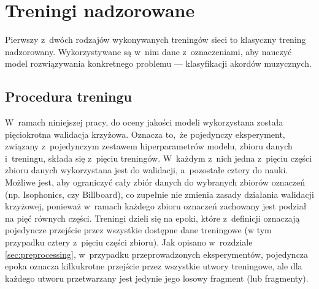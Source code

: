 \section{Treningi nadzorowane}

Pierwszy z~dwóch rodzajów wykonywanych treningów sieci to klasyczny trening nadzorowany.  Wykorzystywane są w~nim dane z~oznaczeniami, aby nauczyć model rozwiązywania konkretnego problemu --- klasyfikacji akordów muzycznych. 


\subsection{Procedura treningu}

W~ramach niniejszej pracy, do oceny jakości modeli wykorzystana została pięciokrotna walidacja krzyżowa. Oznacza to, że pojedynczy eksperyment, związany z~pojedynczym zestawem hiperparametrów modelu, zbioru danych i~treningu, składa się z~pięciu treningów. W~każdym z~nich jedna z~pięciu części zbioru danych wykorzystana jest do walidacji, a~pozostałe cztery do nauki. Możliwe jest, aby ograniczyć cały zbiór danych do wybranych zbiorów oznaczeń (np. Isophonics, czy Billboard), co zupełnie nie zmienia zasady działania walidacji krzyżowej, ponieważ w~ramach każdego zbioru oznaczeń zachowany jest podział na pięć równych części. Treningi dzieli się na epoki, które z~definicji oznaczają pojedyncze przejście przez wszystkie dostępne dane treningowe (w tym przypadku cztery z~pięciu części zbioru). Jak opisano w~rozdziale \ref{sec:preprocessing}, w~przypadku przeprowadzonych eksperymentów, pojedyncza epoka oznacza kilkukrotne przejście przez wszystkie utwory treningowe, ale dla każdego utworu przetwarzany jest jedynie jego losowy fragment (lub fragmenty).

